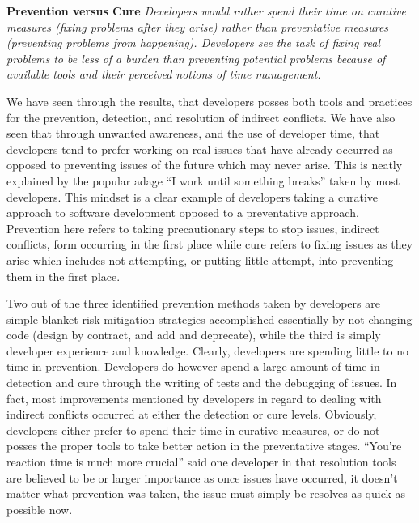 \textbf{Prevention versus Cure}  \textit{Developers would rather spend their time on curative measures (fixing problems after they
arise) rather than preventative measures (preventing problems from happening). Developers see the task of fixing real problems
to be less of a burden than preventing potential problems because of available tools and their perceived notions of time management.}

We have seen through the results, that developers posses both tools and practices for the prevention,
detection, and resolution of indirect conflicts. We have also seen that through unwanted awareness, and the use of developer time,
that developers tend to prefer working on real issues that have already occurred as opposed to preventing issues of the future which
may never arise. This is neatly explained by the popular adage ``I work until something breaks'' taken by most developers. This mindset
is a clear example of developers taking a curative approach to software development opposed to a preventative approach.
Prevention here refers to taking precautionary steps to stop issues, indirect conflicts, form occurring in the first
place while cure refers to fixing issues as they arise which includes not attempting, or putting little attempt, into preventing
them in the first place.

Two out of the three identified prevention methods taken by developers are simple blanket risk mitigation strategies
accomplished essentially by
not changing code (design by contract, and add and deprecate), while the third is simply developer experience and knowledge. Clearly,
developers are spending little to no time in prevention. Developers do however spend a large amount of time in detection and cure through the
writing of tests and the debugging of issues. In fact, most improvements mentioned by developers in regard to dealing with indirect
conflicts occurred at either the detection or cure levels. Obviously, developers either prefer to spend their time in curative
measures, or do not posses the proper tools to take better action in the preventative stages. ``You're reaction time is much more crucial''
said one developer in that resolution tools are believed to be or larger importance as once issues have occurred, it doesn't
matter what prevention was taken, the issue must simply be resolves as quick as possible now.

